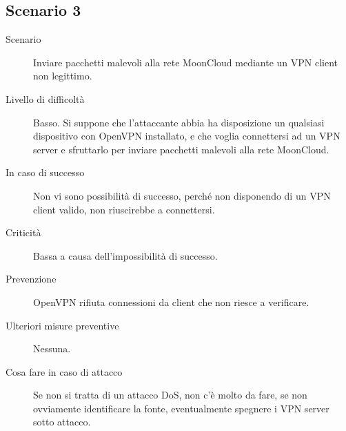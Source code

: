 \subsection{Scenario 3}
\begin{description}
    \item[Scenario]Inviare pacchetti malevoli alla rete MoonCloud
    mediante un VPN client non legittimo.
    \item[Livello di difficoltà]Basso. Si suppone che l'attaccante abbia
    ha disposizione un qualsiasi dispositivo con OpenVPN installato, e che
    voglia connettersi ad un VPN server e sfruttarlo per inviare
    pacchetti malevoli alla rete MoonCloud.
    \item[In caso di successo]Non vi sono possibilità di successo, perché
    non disponendo di un VPN client valido, non riuscirebbe a connettersi.
    \item[Criticità]Bassa a causa dell'impossibilità di successo.
    \item[Prevenzione]OpenVPN rifiuta connessioni da client che non riesce
    a verificare. 
    \item[Ulteriori misure preventive]Nessuna.
    \item[Cosa fare in caso di attacco]Se non si tratta di un attacco DoS,
    non c'è molto da fare, se non ovviamente identificare la fonte, eventualmente
    spegnere i VPN server sotto attacco.
\end{description}

